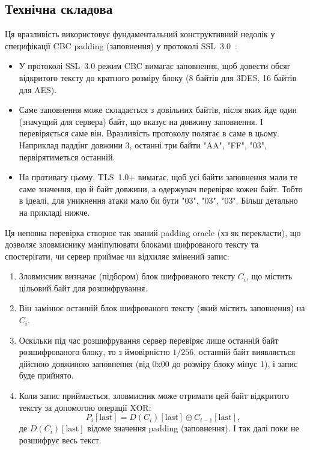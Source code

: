 \subsection{Технічна складова}

Ця вразливість використовує фундаментальний конструктивний недолік у специфікації CBC padding (заповнення) у 
протоколі SSL~3.0~\cite{rfc6101}:

\begin{itemize}
    \item У протоколі SSL~3.0 режим CBC вимагає заповнення, щоб довести обсяг відкритого тексту до кратного
        розміру блоку (8 байтів для 3DES, 16 байтів для AES).
    \item Саме заповнення може складається з довільних байтів, після яких йде один (значущий для сервера) байт, 
        що вказує на довжину заповнення. І перевіряється саме він. Вразливість протоколу полягає в саме в цьому. 
        Наприклад паддінг довжини 3, останні три байти "AA"{}, "FF"{}, "03"{}, первірятиметься останній.
    \item На противагу цьому, TLS~1.0+ вимагає, щоб усі байти заповнення мали те саме значення, що й байт
    довжини, а одержувач перевіряє кожен байт. Тобто в ідеалі, для уникнення атаки мало би бути "03"{}, "03"{}, "03"{}. 
    Більш детально на прикладі нижче.
\end{itemize}

Ця неповна перевірка створює так званий padding oracle (хз як перекласти), що дозволяє зловмиснику маніпулювати 
блоками шифрованого тексту та спостерігати, чи сервер приймає чи відхиляє змінений запис:

\begin{enumerate}
    \item Зловмисник визначає (підбором) блок шифрованого тексту $C_i$, що містить цільовий байт для розшифрування.
    \item Він замінює останній блок шифрованого тексту (який містить заповнення) на $C_i$.
    \item Оскільки під час розшифрування сервер перевіряє лише останній байт розшифрованого блоку, то з ймовірністю 
        $1/256$, останній байт виявляється дійсною довжиною заповнення (від 0x00 до розміру блоку мінус 1), 
        і запис буде прийнято.
    \item Коли запис приймається, зловмисник може отримати цей байт відкритого тексту за допомогою операції XOR:
    \begin{equation*}
        P_i[\text{last}] = D(C_i)[\text{last}] \oplus C_{i-1}[\text{last}],
    \end{equation*}
    де $D(C_i)[\text{last}]$ відоме значення padding (заповнення). І так далі поки не розшифрує весь текст.
\end{enumerate}

